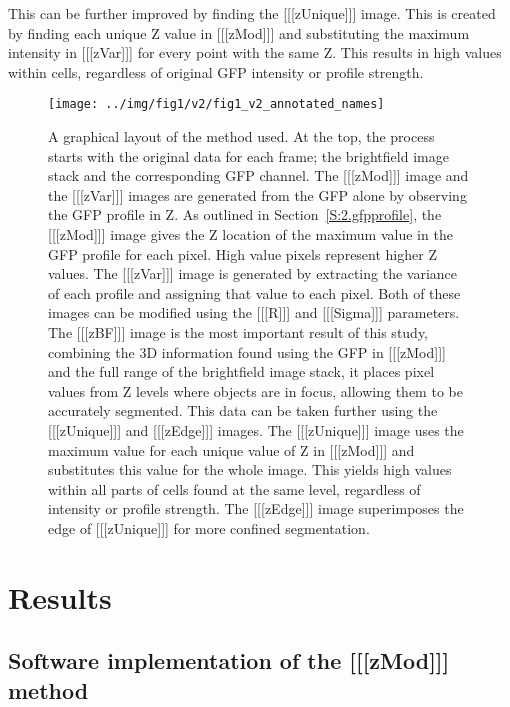 \documentclass[preprint,11pt,5p,twocolumn]{elsarticle}
\begin{document}
This can be further improved by finding the [[[zUnique]]] image. This is created by finding each unique Z value in [[[zMod]]] and substituting the maximum intensity in [[[zVar]]] for every point with the same Z. This results in high values within cells, regardless of original GFP intensity or profile strength.

\begin{figure}
\centering\texttt{[image: ../img/fig1/v2/fig1\_v2\_annotated\_names]}
\label{fig:method_flowchart}
\caption{A graphical layout of the method used. At the top, the process starts with the original data for each frame; the brightfield image stack and the corresponding GFP channel. The [[[zMod]]] image and the [[[zVar]]] images are generated from the GFP alone by observing the GFP profile in Z. As outlined in Section~\ref{S:2.gfpprofile}, the [[[zMod]]] image gives the Z location of the maximum value in the GFP profile for each pixel. High value pixels represent higher Z values. The [[[zVar]]] image is generated by extracting the variance of each profile and assigning that value to each pixel. Both of these images can be modified using the [[[R]]] and [[[Sigma]]] parameters. The [[[zBF]]] image is the most important result of this study, combining the 3D information found using the GFP in [[[zMod]]] and the full range of the brightfield image stack, it places pixel values from Z levels where objects are in focus, allowing them to be accurately segmented. This data can be taken further using the [[[zUnique]]] and [[[zEdge]]] images. The [[[zUnique]]] image uses the maximum value for each unique value of Z in [[[zMod]]] and substitutes this value for the whole image. This yields high values within all parts of cells found at the same level, regardless of intensity or profile strength. The [[[zEdge]]] image superimposes the edge of [[[zUnique]]] for more confined segmentation.}
\end{figure}

\section{Results}
\label{S:results}

\subsection{Software implementation of the [[[zMod]]] method}
\end{document}
